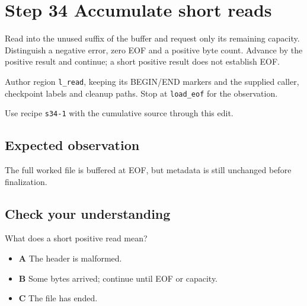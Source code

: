 \section{Step 34 Accumulate short reads}\label{ppm-s34}

Read into the unused suffix of the buffer and request only its remaining capacity. Distinguish a negative error, zero EOF and a positive byte count. Advance by the positive result and continue; a short positive result does not establish EOF.

Author region \texttt{l\_read}, keeping its BEGIN/END markers and the supplied caller, checkpoint labels and cleanup paths. Stop at \texttt{load\_eof} for the observation.

Use recipe \texttt{s34-1} with the cumulative source through this edit.

\subsection{Expected observation}
The full worked file is buffered at EOF, but metadata is still unchanged before finalization.

\subsection{Check your understanding}
What does a short positive read mean?

\begin{itemize}
  \item \textbf{A} The header is malformed.
  \item \textbf{B} Some bytes arrived; continue until EOF or capacity.
  \item \textbf{C} The file has ended.
\end{itemize}
